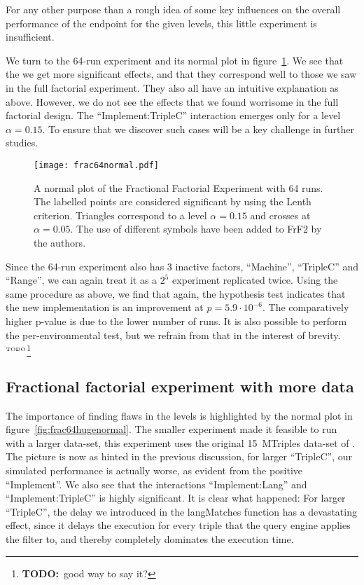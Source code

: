 \documentclass{llncs}
\newcommand{\todo}[1]{\ensuremath{^{\textrm{\tiny{TODO}\normalsize}}}\footnote{\textbf{TODO:}~#1}}
\begin{document}
For any other purpose than a rough idea of some key influences on the
overall performance of the endpoint for the given levels, this little
experiment is insufficient.

We turn to the 64-run experiment and its normal plot in
figure~\ref{fig:frac64normal}. We see that the we get more significant
effects, and that they correspond well to those we saw in the full
factorial experiment. They also all have an intuitive
explanation as above. However, we do not see the effects that we found
worrisome in the full factorial design. The ``Implement:TripleC''
interaction emerges only for a level $\alpha=0.15$. To ensure that we discover such
cases will be a key challenge in further studies.

\begin{figure}[ht]
  \texttt{[image: frac64normal.pdf]}
  \caption{A normal plot of the Fractional Factorial Experiment with
    64 runs. The labelled points are considered significant by using
    the Lenth criterion. Triangles correspond to a level $\alpha=0.15$
    and crosses at $\alpha=0.05$. The use of different symbols have
    been added to FrF2 by the authors.}\label{fig:frac64normal}
\end{figure}

Since the 64-run experiment also has 3 inactive factors, ``Machine'',
``TripleC'' and ``Range'', we can again treat it as a $2^5$ experiment
replicated twice. Using the same procedure as above, we find that
again, the hypothesis test indicates that the new implementation is an
improvement at $p = 5.9 \cdot 10^{-6}$. The comparatively higher p-value
is due to the lower number of runs. It is also possible to perform the
per-environmental test, but we refrain from that in the interest of
brevity.\todo{good way to say it?}


\subsection{Fractional factorial experiment with more data}\label{sec:hugefrac}

The importance of finding flaws in the levels is highlighted by the
normal plot in figure~\ref{fig:frac64hugenormal}. The smaller
experiment made it feasible to run with a larger data-set, this
experiment uses the original 15~MTriples data-set of
\cite{mxro:Morsey2011DBpedia}. The picture is now as hinted in the
previous discussion, for larger ``TripleC'', our simulated performance
is actually worse, as evident from the positive ``Implement''. We also
see that the interactions ``Implement:Lang'' and ``Implement:TripleC''
is highly significant. It is clear what happened: For larger
``TripleC'', the delay we introduced in the langMatches function has a
devastating effect, since it delays the execution for every triple
that the query engine applies the filter to, and thereby completely
dominates the execution time.
\end{document}
